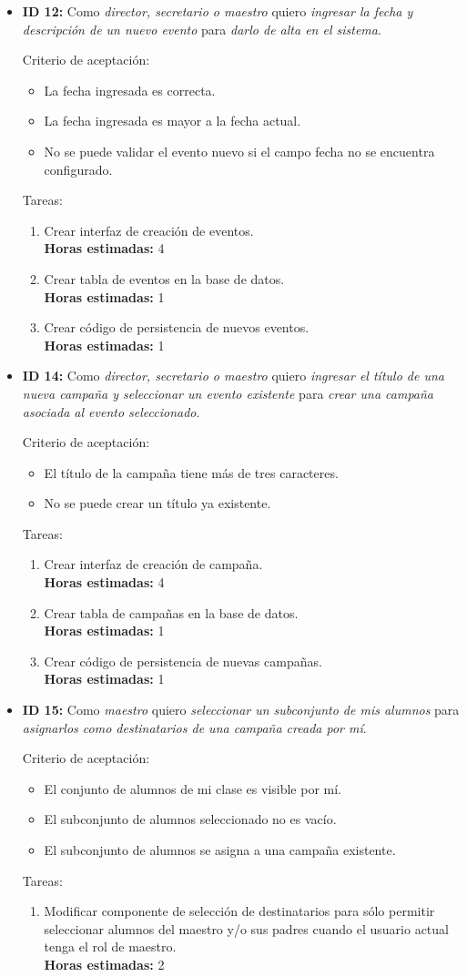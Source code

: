 \documentclass[a4paper, 10pt, twoside]{article}
\newenvironment{stories}{
  \begin{itemize}
}{
  \end{itemize}
}
\newcommand{\storyid}[4]{
  \item
  \textbf{ID #1:} Como \emph{#2} quiero \emph{#3} para \emph{#4}.
}
\newenvironment{tasks}{
  Tareas:
  \begin{enumerate}
}{
  \end{enumerate}
}
\newcommand{\task}[1] {
  \item #1.\\
  \textbf{Horas estimadas:}
}
\newenvironment{criterios}{
  Criterio de aceptación:
  \begin{itemize}
}{
  \end{itemize}
}
\newcommand{\criteria}[1] {
  \item #1
}
\begin{document}
\begin{stories}

  \storyid{12}
          {director, secretario o maestro}
          {ingresar la fecha y descripción de un nuevo evento}
          {darlo de alta en el sistema}
        
   \begin{criterios}
    \criteria{La fecha ingresada es correcta.}
  	\criteria{La fecha ingresada es mayor a la fecha actual.}
    \criteria{No se puede validar el evento nuevo si el campo fecha no se encuentra configurado.}
  \end{criterios} 
   
  \begin{tasks}
    \task{Crear interfaz de creación de eventos} 4
    \task{Crear tabla de eventos en la base de datos} 1
    \task{Crear código de persistencia de nuevos eventos} 1
  \end{tasks}


  \storyid{14}
          {director, secretario o maestro}
          {ingresar el título de una nueva campaña y seleccionar un evento existente}
          {crear una campaña asociada al evento seleccionado}
  
   \begin{criterios}
  	\criteria{El título de la campaña tiene más de tres caracteres.}
    \criteria{No se puede crear un título ya existente.}
  \end{criterios} 

  \begin{tasks}
    \task{Crear interfaz de creación de campaña} 4
    \task{Crear tabla de campañas en la base de datos} 1
    \task{Crear código de persistencia de nuevas campañas} 1
  \end{tasks}


  \storyid{15}
          {maestro}
          {seleccionar un subconjunto de mis alumnos}
          {asignarlos como destinatarios de una campaña creada por mí}
            
   \begin{criterios}
  	\criteria{El conjunto de alumnos de mi clase es visible por mí.}
    \criteria{El subconjunto de alumnos seleccionado no es vacío.}
    \criteria{El subconjunto de alumnos se asigna a una campaña existente.}
  \end{criterios} 
   

  \begin{tasks}
    \task{Modificar componente de selección de destinatarios para sólo permitir seleccionar alumnos del maestro y/o sus padres cuando el usuario actual tenga el rol de maestro} 2
  \end{tasks}



\end{stories}
\end{document}
